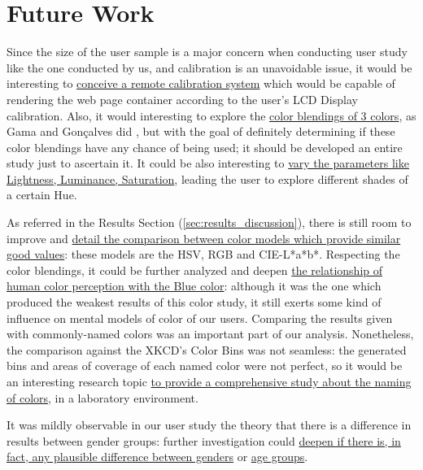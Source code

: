 \section{Future Work}
\label{sec:future_work}
%
Since the size of the user sample is a major concern when
conducting user study like the one conducted by us, and calibration is an unavoidable issue, it would be interesting to \ul{conceive a remote calibration system}
which would be capable of rendering the web page container according to the user's LCD Display calibration.
Also, it would interesting to explore the \ul{color blendings of 3 colors}, as Gama and Gonçalves did \cite{Gama20141}, but with the goal of definitely
determining if these color blendings have any chance of being used; it should be developed an entire study just to ascertain it. It could be also interesting
to \ul{vary the parameters like Lightness, Luminance, Saturation}, leading the user to explore different shades of a certain Hue. \par
%
As referred in the Results Section (\ref{sec:results_discussion}), there is still room to improve and \ul{detail the comparison between color models which provide
similar good values}: these models are the HSV, RGB and CIE-L*a*b*. Respecting the color blendings, it could be further analyzed and deepen \ul{the relationship of human
color perception with the Blue color}: although it was the one which produced the weakest results of this color study, it still exerts some kind of influence on
mental models of color of our users.
Comparing the results given with commonly-named colors was an important part of our analysis. Nonetheless, the comparison against the XKCD's Color Bins was not seamless:
the generated bins and areas of coverage of each named color were not perfect, so it would be an interesting research topic \ul{to provide a comprehensive study about
the naming of colors}, in a laboratory environment. \par
%
It was mildly observable in our user study the theory that there is a difference in results between gender groups: further investigation could \ul{deepen if there is, in
fact, any plausible difference between genders} or \ul{age groups}.
%
